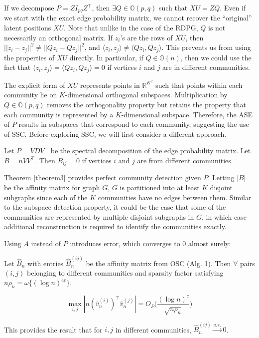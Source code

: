 \documentclass[
  12pt,
]{article}
\begin{document}
If we decompose \(P = Z I_{pq} Z^\top\), then
\(\exists Q \in \mathbb{O}(p, q)\) such that \(XU = Z Q\). Even if we
start with the exact edge probability matrix, we cannot recover the
``original'' latent positions \(XU\). Note that unlike in the case of
the RDPG, \(Q\) is not necessarily an orthogonal matrix. If \(z_i\)'s
are the rows of \(XU\), then
\(||z_i - z_j||^2 \neq ||Q z_i - Q z_j||^2\), and
\(\langle z_i, z_j \rangle \neq \langle Q z_i, Q z_j \rangle\). This
prevents us from using the properties of \(XU\) directly. In particular,
if \(Q \in \mathbb{O}(n)\), then we could use the fact that
\(\langle z_i, z_j \rangle = \langle Q z_i, Q z_j \rangle = 0\) if
vertices \(i\) and \(j\) are in different communities.

The explicit form of \(XU\) represents points in \(\mathbb{R}^{K^2}\)
such that points within each community lie on \(K\)-dimensional
orthogonal subspaces. Multiplication by \(Q \in \mathbb{O}(p, q)\)
removes the orthogonality property but retains the property that each
community is represented by a \(K\)-dimensional subspace. Therefore, the
ASE of \(P\) results in subspaces that correspond to each community,
suggesting the use of SSC. Before exploring SSC, we will first consider
a different approach.

\begin{theorem}
\label{theorem3}
Let $P = V D V^\top$ be the spectral decomposition of the edge probability
matrix. Let $B = n V V^\top$. Then $B_{ij} = 0$ if vertices $i$ and $j$ are 
from different communities.
\end{theorem}

Theorem \ref{theorem3} provides perfect community detection given \(P\).
Letting \(|B|\) be the affinity matrix for graph \(G\), \(G\) is
partitioned into at least \(K\) disjoint subgraphs since each of the
\(K\) communities have no edges between them. Similar to the subspace
detection property, it could be the case that some of the communities
are represented by multiple disjoint subgraphs in \(G\), in which case
additional reconstruction is required to identify the communities
exactly.

Using \(A\) instead of \(P\) introduces error, which converges to \(0\)
almost surely:

\begin{theorem}
\label{theorem4} 
Let $\hat{B}_n$ with entries $\hat{B}_n^{(ij)}$ be the affinity matrix from OSC 
(Alg. 1). Then $\forall$ pairs $(i, j)$ belonging to different communities 
and sparsity factor satisfying $n \rho_n = \omega\{(\log n)^{4c}\}$, 

\begin{equation} \label{eq:thm4}
\max_{i, j} |n (\hat{v}_n^{(i)})^\top \hat{v}_n^{(j)}| = 
O_P \Big( \frac{(\log n)^c}{\sqrt{n \rho_n}} \Big)
\end{equation}

This provides the result that for $i, j$ in different communities, 
$\hat{B}_n^{(ij)} \stackrel{a.s.}{\to} 0$.
\end{theorem}
\end{document}
